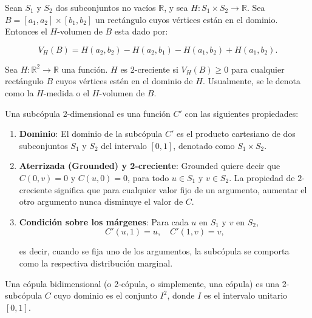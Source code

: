 \begin{defn}
    Sean $S_1$ y $S_2$ dos subconjuntos no vacíos $\mathbb{R}$, y sea $H:S_1 \times S_2 \rightarrow \mathbb{R}$. Sea $B = [a_1, a_2] \times [b_1, b_2]$ un rectángulo cuyos vértices están en el dominio. Entonces el $H$-volumen de $B$ esta dado por:

    \begin{equation}
        V_H(B) = H(a_2, b_2) - H(a_2, b_1) - H(a_1, b_2) + H(a_1, b_2).
    \end{equation}
\end{defn}

\begin{defn}[$2$-creciente]
    Sea $H: \mathbb{R}^2 \to \mathbb{R}$ una función. $H$ es $2$-creciente si $V_H(B) \geq 0$ para cualquier rectángulo $B$ cuyos vértices estén en el dominio de $H$. Usualmente, se le denota como la $H$-medida o el $H$-volumen de $B$.
\end{defn}



\begin{defn}[Subcópula]
    Una subcópula 2-dimensional es una función $C'$ con las siguientes propiedades:

    \begin{enumerate}
        \item \textbf{Dominio}: El dominio de la subcópula $C'$ es el producto cartesiano de dos subconjuntos $S_1$ y $S_2$ del intervalo $[0, 1]$, denotado como $S_1 \times S_2$.

        \item \textbf{Aterrizada (Grounded) y 2-creciente}: Grounded quiere decir que $C(0,v)=0$ y $C(u,0)=0$, para todo $u \in S_1$ y $v \in S_2$. La propiedad de $2$-creciente significa que para cualquier valor fijo de un argumento, aumentar el otro argumento nunca disminuye el valor de $C$.

        \item \textbf{Condición sobre los márgenes}: Para cada $u$ en $S_1$ y $v$ en $S_2$, 
        \begin{equation}
            C'(u, 1) = u, \quad C'(1, v) = v,
        \end{equation}

        es decir, cuando se fija uno de los argumentos, la subcópula se comporta como la respectiva distribución marginal.
    \end{enumerate}
\end{defn}


\begin{defn}
    Una cópula bidimensional (o 2-cópula, o simplemente, una cópula) es una 2-subcópula $C$ cuyo dominio es el conjunto $I^2$, donde $I$ es el intervalo unitario $[0,1]$. 
\end{defn}

